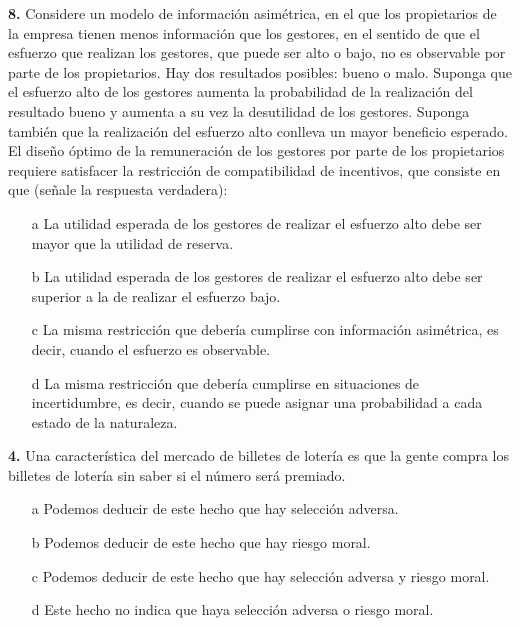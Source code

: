 \documentclass{nuevotema}
\begin{document}

\textbf{8.} Considere un modelo de información asimétrica, en el que los propietarios de la empresa tienen menos información que los gestores, en el sentido de que el esfuerzo que realizan los gestores, que puede ser alto o bajo, no es observable por parte de los propietarios. Hay dos resultados posibles: bueno o malo. Suponga que el esfuerzo alto de los gestores aumenta la probabilidad de la realización del resultado bueno y aumenta a su vez la desutilidad de los gestores. Suponga también que la realización del esfuerzo alto conlleva un mayor beneficio esperado. El diseño óptimo de la remuneración de los gestores por parte de los propietarios requiere satisfacer la restricción de compatibilidad de incentivos, que consiste en que (señale la respuesta verdadera):

\begin{itemize}
	\item[a] La utilidad esperada de los gestores de realizar el esfuerzo alto debe ser mayor que la utilidad de reserva.
	\item[b] La utilidad esperada de los gestores de realizar el esfuerzo alto debe ser superior a la de realizar el esfuerzo bajo.
	\item[c] La misma restricción que debería cumplirse con información asimétrica, es decir, cuando el esfuerzo es observable.
	\item[d] La misma restricción que debería cumplirse en situaciones de incertidumbre, es decir, cuando se puede asignar una probabilidad a cada estado de la naturaleza.
\end{itemize}


\textbf{4.} Una característica del mercado de billetes de lotería es que la gente compra los billetes de lotería sin saber si el número será premiado.

\begin{itemize}
	\item[a] Podemos deducir de este hecho que hay selección adversa.
	\item[b] Podemos deducir de este hecho que hay riesgo moral.
	\item[c] Podemos deducir de este hecho que hay selección adversa y riesgo moral.
	\item[d] Este hecho no indica que haya selección adversa o riesgo moral.
\end{itemize}

\end{document}
